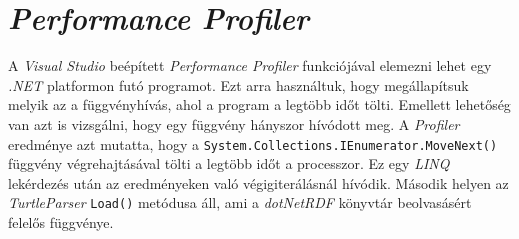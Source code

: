 %
%
%
%

\section{\emph{Performance Profiler}}

A \emph{Visual Studio} beépített \emph{Performance Profiler} funkciójával elemezni lehet egy \emph{.NET} platformon futó programot. Ezt arra használtuk, hogy megállapítsuk melyik az a függvényhívás, ahol a program a legtöbb időt tölti. Emellett lehetőség van azt is vizsgálni, hogy egy függvény hányszor hívódott meg. A \emph{Profiler} eredménye azt mutatta, hogy a \texttt{System.Collections.IEnumerator.MoveNext()} függvény végrehajtásával tölti a legtöbb időt a processzor. Ez egy \emph{LINQ} lekérdezés után az eredményeken való végigiterálásnál hívódik. Második helyen az \emph{TurtleParser} \texttt{Load()} metódusa áll, ami a \emph{dotNetRDF} könyvtár beolvasásért felelős függvénye.

%